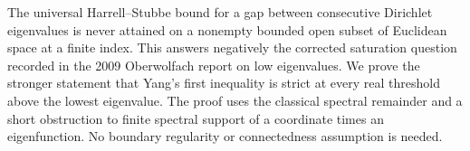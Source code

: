 
The universal Harrell--Stubbe bound for a gap between consecutive Dirichlet eigenvalues is never attained on a nonempty bounded open subset of Euclidean space at a finite index. This answers negatively the corrected saturation question recorded in the 2009 Oberwolfach report on low eigenvalues. We prove the stronger statement that Yang's first inequality is strict at every real threshold above the lowest eigenvalue. The proof uses the classical spectral remainder and a short obstruction to finite spectral support of a coordinate times an eigenfunction. No boundary regularity or connectedness assumption is needed.
